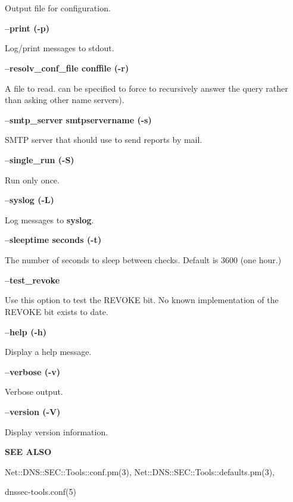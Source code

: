 \begin{description}
Output file for configuration.

\item {\bf --print (-p)}\verb" "

Log/print messages to stdout.

\item {\bf --resolv\_conf\_file conffile (-r)}\verb" "

A  file to read.   can be specified to force
 to recursively answer the query rather than asking other name
servers).

\item {\bf --smtp\_server smtpservername (-s)}\verb" "

SMTP server that  should use to send reports by mail.

\item {\bf --single\_run (-S)}\verb" "

Run only once.

\item {\bf --syslog (-L)}\verb" "

Log messages to {\bf syslog}.

\item {\bf --sleeptime seconds (-t)}\verb" "

The number of seconds to sleep between checks. Default is 3600 (one hour.)

\item {\bf --test\_revoke}\verb" "

Use this option to test the REVOKE bit. No known implementation of
the REVOKE bit exists to date.

\item {\bf --help (-h)}\verb" "

Display a help message.

\item {\bf --verbose (-v)}\verb" "

Verbose output.

\item {\bf --version (-V)}\verb" "

Display version information.

\end{description}

{\bf SEE ALSO}

Net::DNS::SEC::Tools::conf.pm(3),
Net::DNS::SEC::Tools::defaults.pm(3),

dnssec-tools.conf(5)

